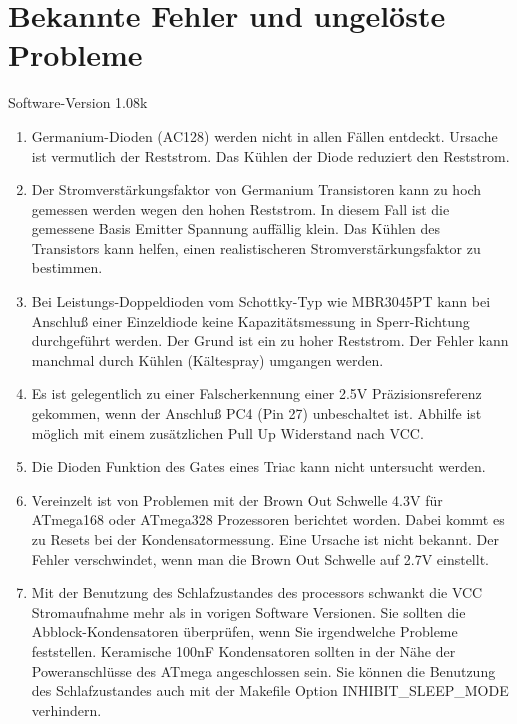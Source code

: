 
\chapter{Bekannte Fehler und ungelöste Probleme}
{\center Software-Version 1.08k}

\begin{enumerate}

\item Germanium-Dioden (AC128) werden nicht in allen Fällen entdeckt. Ursache ist vermutlich der Reststrom.
Das Kühlen der Diode reduziert den Reststrom.

\item Der Stromverstärkungsfaktor von Germanium Transistoren kann zu hoch gemessen werden wegen den hohen Reststrom.
In diesem Fall ist die gemessene Basis Emitter Spannung auffällig klein.
Das Kühlen des Transistors kann helfen, einen realistischeren Stromverstärkungsfaktor zu bestimmen.

\item Bei Leistungs-Doppeldioden vom Schottky-Typ wie MBR3045PT kann bei Anschluß einer Einzeldiode keine Kapazitätsmessung in Sperr-Richtung 
durchgeführt werden. Der Grund ist ein zu hoher Reststrom. Der Fehler kann manchmal durch Kühlen (Kältespray) umgangen werden.

\item Es ist gelegentlich zu einer Falscherkennung einer 2.5V Präzisionsreferenz gekommen, wenn der Anschluß PC4 (Pin 27) unbeschaltet ist.
Abhilfe ist möglich mit einem zusätzlichen Pull Up Widerstand nach VCC.

\item Die Dioden Funktion des Gates eines Triac kann nicht untersucht werden.

\item Vereinzelt ist von Problemen mit der Brown Out Schwelle 4.3V für ATmega168 oder ATmega328 Prozessoren berichtet worden.
Dabei kommt es zu Resets bei der Kondensatormessung.  Eine Ursache ist nicht bekannt.
Der Fehler verschwindet, wenn man die Brown Out Schwelle auf 2.7V einstellt.

\item Mit der Benutzung des Schlafzustandes des processors schwankt die VCC Stromaufnahme mehr als
in vorigen Software Versionen. Sie sollten die Abblock-Kondensatoren überprüfen, wenn Sie irgendwelche
Probleme feststellen. Keramische 100nF Kondensatoren sollten in der Nähe der Poweranschlüsse des ATmega
angeschlossen sein. Sie können die Benutzung des Schlafzustandes auch mit der Makefile Option
INHIBIT\_SLEEP\_MODE verhindern.

\end{enumerate}
